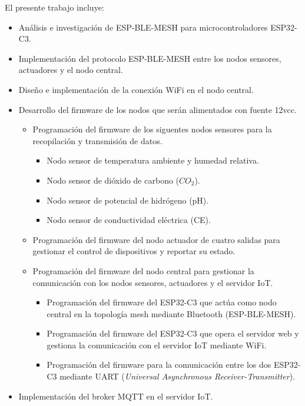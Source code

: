 \documentclass[
11pt, %
codirector, %
]{charter}
\begin{document}
El presente trabajo incluye:
\begin{itemize}
	\item Análisis e investigación de ESP-BLE-MESH para microcontroladores ESP32-C3.
	\item Implementación del protocolo ESP-BLE-MESH entre los nodos sensores, actuadores y el nodo central.
	\item Diseño e implementación de la conexión WiFi en el nodo central.
	\item Desarrollo del firmware de los nodos que serán alimentados con fuente 12vcc.
	      \begin{itemize}
		      \item Programación del firmware de los siguentes nodos sensores para la recopilación y transmisión de datos.
		            \begin{itemize}
			            \item Nodo sensor de temperatura ambiente y humedad relativa.
			            \item Nodo sensor de dióxido de carbono ($CO_2$).
			            \item Nodo sensor de potencial de hidrógeno (pH).
			            \item Nodo sensor de conductividad eléctrica (CE).
		            \end{itemize}
		      \item Programación del firmware del nodo actuador de cuatro salidas para gestionar el control de dispositivos y reportar su estado.
		      \item Programación del firmware del nodo central para gestionar la comunicación con los nodos sensores, actuadores y el servidor IoT.
		            \begin{itemize}
			            \item Programación del firmware del ESP32-C3 que actúa como nodo central en la topología mesh mediante Bluetooth (ESP-BLE-MESH).
			            \item Programación del firmware del ESP32-C3 que opera el servidor web y gestiona la comunicación con el servidor IoT mediante WiFi.
			            \item Programación del firmware para la comunicación entre los dos ESP32-C3 mediante UART (\textit{Universal Asynchronous Receiver-Transmitter}).
		            \end{itemize}
	      \end{itemize}
	\item Implementación del broker MQTT en el servidor IoT.

\end{itemize}
\end{document}
